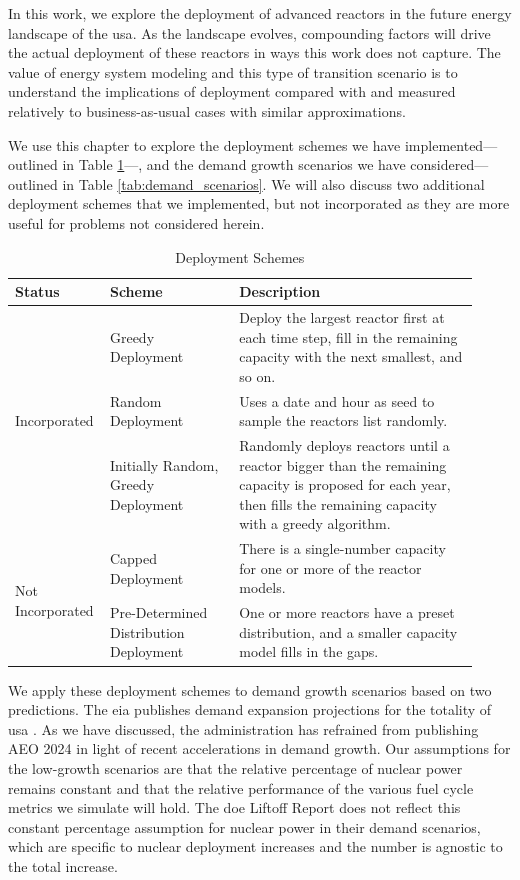 In this work, we explore the deployment of advanced reactors in the future
energy landscape of the \gls{usa}. As the landscape evolves, compounding
factors will drive the actual deployment of these reactors in ways this work
does not capture. The value of energy system modeling and this type of
transition scenario is to understand the implications of deployment compared
with and measured relatively to business-as-usual cases with similar
approximations.

We use this chapter to explore the deployment schemes we have
implemented---outlined in Table \ref{tab:deployment_schemes}---, and the demand
growth scenarios we have considered---outlined in Table
\ref{tab:demand_scenarios}. We will also discuss two additional deployment
schemes that we implemented, but not incorporated as they are more useful for
problems not considered herein.

\begin{table}[htbp]
    \centering
    \caption{Deployment Schemes}
    \label{tab:deployment_schemes}
    \begin{tabular}{p{0.15\linewidth} p{0.27\linewidth} p{0.50\linewidth}}
        \hline
        \textbf{Status} & \textbf{Scheme} & \textbf{Description} \\
        \hline
        \multirow{3}{*}{Incorporated} & Greedy Deployment & Deploy the largest
        reactor first at each time step, fill in the remaining capacity with
        the next smallest, and so on. \\
        & Random Deployment & Uses a date and hour as seed to sample the
        reactors list randomly. \\
        & Initially Random, Greedy Deployment & Randomly deploys reactors until
        a reactor bigger than the remaining capacity is proposed for each year,
        then fills the remaining capacity with a greedy algorithm. \\
        \hline
        \multirow{2}{*}{Not Incorporated} & Capped Deployment & There is a
        single-number capacity for one or more of the reactor models. \\
        & Pre-Determined Distribution Deployment & One or more reactors have a
        preset distribution, and a smaller capacity model fills in the gaps. \\
        \hline
    \end{tabular}
\end{table}

We apply these deployment schemes to demand growth scenarios based on two
predictions. The \gls{eia} publishes demand expansion projections for the
totality of \gls{usa} \cite{eia_aeo_2023}. As we have discussed, the
administration has refrained from publishing AEO 2024 in light of recent
accelerations in demand growth. Our assumptions for the low-growth scenarios
are that the relative percentage of nuclear power remains constant and that the
relative performance of the various fuel cycle metrics we simulate will hold.
The \gls{doe} Liftoff Report \cite{julie_liftoff_pathways_2024} does not
reflect this constant percentage assumption for nuclear power in their demand
scenarios, which are specific to nuclear deployment increases and the number is
agnostic to the total increase.

